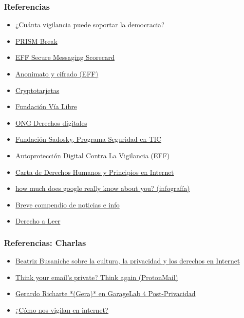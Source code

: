 \documentclass{beamer}
\begin{document}
\begin{frame}
  \frametitle{Referencias}
  \begin{itemize}
  \item \href{https://www.gnu.org/philosophy/surveillance-vs-democracy.es.html}{¿Cuánta vigilancia puede soportar la democracia?}
  \item \href{https://prism-break.org/es/}{PRISM Break}
  \item \href{https://www.eff.org/es/secure-messaging-scorecard}{EFF Secure Messaging Scorecard}
  \item \href{https://www.eff.org/files/2015/03/18/anonimatoycifrado-eff-11.pdf}{Anonimato y cifrado (EFF)}
  \item \href{http://media.espora.org/mgoblin_media/media_entries/1495/Criptotarjetas_RanchoElectronico.pdf}{Cryptotarjetas}
  \item \href{http://www.vialibre.org.ar}{Fundación Vía Libre}
  \item \href{https://www.derechosdigitales.org}{ONG Derechos digitales}
  \item \href{http://www.fundacionsadosky.org.ar/es/programas-proyectos/seguridad-en-tic}{Fundación Sadosky, Programa Seguridad en TIC}
  \item \href{https://ssd.eff.org/es}{Autoprotección Digital Contra La Vigilancia (EFF)}
  \item \href{http://diadeinternet.org/pdfs/Internet_Derechos_Principios.pdf}{Carta de Derechos Humanos y Principios en Internet}
  \item \href{http://www.visualistan.com/2015/02/how-much-does-google-really-know-about-you.html}{how much does google really know about you? (infografía)}
  \item \href{http://www.scoop.it/IPcontrol}
{Breve compendio de noticias e info}  
\item \href{http://derechoaleer.org}{Derecho a Leer}
  \end{itemize}
\end{frame}  
 

\begin{frame}
  \frametitle{Referencias: Charlas}
  \begin{itemize}
    \item \href{https://www.youtube.com/watch?v=lCQ_GA1nmtk}{Beatriz Busaniche sobre la cultura, la privacidad y los derechos en Internet}
      \item \href{http://www.ted.com/talks/andy_yen_think_your_email_s_private_think_again}{Think your email's private? Think again (ProtonMail)}
  \item \href{https://vimeo.com/10965423}{Gerardo Richarte *(Gera)* en GarageLab 4 Post-Privacidad}
 \item \href{https://www.youtube.com/watch?v=tnDxRjMDGQM}{¿Cómo nos vigilan en internet?}
\end{itemize}
\end{frame}  
\end{document}
